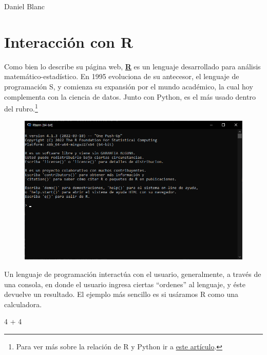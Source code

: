 \documentclass[
  letterpaper,
  DIV=11,
  numbers=noendperiod]{scrreprt}
\newenvironment{Shaded}{\begin{snugshade}}{\end{snugshade}}
\newcommand{\DecValTok}[1]{\textcolor[rgb]{0.68,0.00,0.00}{#1}}
\newcommand{\SpecialCharTok}[1]{\textcolor[rgb]{0.37,0.37,0.37}{#1}}
\begin{document}
Daniel Blanc

\hfill\break

\hypertarget{interacciuxf3n-con-r}{%
\section{Interacción con R}\label{interacciuxf3n-con-r}}

Como bien lo describe su página web,
\href{https://www.r-project.org/}{\textbf{R}} es un lenguaje
desarrollado para análisis matemático-estadístico. En 1995 evoluciona de
su antecesor, el lenguaje de programación S, y comienza su expansión por
el mundo académico, la cual hoy complementa con la ciencia de datos.
Junto con Python, es el más usado dentro del rubro.\footnote{Para ver
  más sobre la relación de R y Python ir a
  \href{https://www.linkedin.com/pulse/r-o-python-cu\%C3\%A1l-es-el-mejor-para-la-ciencia-de-datos-daniel-blanc/}{este
  artículo}.}

\begin{figure}

{\centering \includegraphics{chapters/images/paste-AC4C7ACA.png}

}

\end{figure}

Un lenguaje de programación interactúa con el usuario, generalmente, a
través de una consola, en donde el usuario ingresa ciertas ``ordenes''
al lenguaje, y éste devuelve un resultado. El ejemplo más sencillo es si
usáramos R como una calculadora.

\begin{Shaded}
\begin{Highlighting}[]
\DecValTok{4} \SpecialCharTok{+} \DecValTok{4}
\end{Highlighting}
\end{Shaded}
\end{document}
